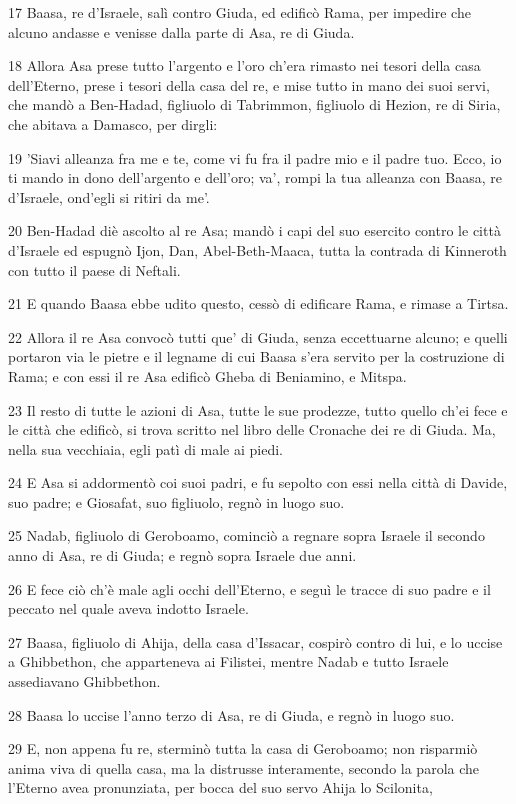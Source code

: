 \par 17 Baasa, re d'Israele, salì contro Giuda, ed edificò Rama, per impedire che alcuno andasse e venisse dalla parte di Asa, re di Giuda.
\par 18 Allora Asa prese tutto l'argento e l'oro ch'era rimasto nei tesori della casa dell'Eterno, prese i tesori della casa del re, e mise tutto in mano dei suoi servi, che mandò a Ben-Hadad, figliuolo di Tabrimmon, figliuolo di Hezion, re di Siria, che abitava a Damasco, per dirgli:
\par 19 'Siavi alleanza fra me e te, come vi fu fra il padre mio e il padre tuo. Ecco, io ti mando in dono dell'argento e dell'oro; va', rompi la tua alleanza con Baasa, re d'Israele, ond'egli si ritiri da me'.
\par 20 Ben-Hadad diè ascolto al re Asa; mandò i capi del suo esercito contro le città d'Israele ed espugnò Ijon, Dan, Abel-Beth-Maaca, tutta la contrada di Kinneroth con tutto il paese di Neftali.
\par 21 E quando Baasa ebbe udito questo, cessò di edificare Rama, e rimase a Tirtsa.
\par 22 Allora il re Asa convocò tutti que' di Giuda, senza eccettuarne alcuno; e quelli portaron via le pietre e il legname di cui Baasa s'era servito per la costruzione di Rama; e con essi il re Asa edificò Gheba di Beniamino, e Mitspa.
\par 23 Il resto di tutte le azioni di Asa, tutte le sue prodezze, tutto quello ch'ei fece e le città che edificò, si trova scritto nel libro delle Cronache dei re di Giuda. Ma, nella sua vecchiaia, egli patì di male ai piedi.
\par 24 E Asa si addormentò coi suoi padri, e fu sepolto con essi nella città di Davide, suo padre; e Giosafat, suo figliuolo, regnò in luogo suo.
\par 25 Nadab, figliuolo di Geroboamo, cominciò a regnare sopra Israele il secondo anno di Asa, re di Giuda; e regnò sopra Israele due anni.
\par 26 E fece ciò ch'è male agli occhi dell'Eterno, e seguì le tracce di suo padre e il peccato nel quale aveva indotto Israele.
\par 27 Baasa, figliuolo di Ahija, della casa d'Issacar, cospirò contro di lui, e lo uccise a Ghibbethon, che apparteneva ai Filistei, mentre Nadab e tutto Israele assediavano Ghibbethon.
\par 28 Baasa lo uccise l'anno terzo di Asa, re di Giuda, e regnò in luogo suo.
\par 29 E, non appena fu re, sterminò tutta la casa di Geroboamo; non risparmiò anima viva di quella casa, ma la distrusse interamente, secondo la parola che l'Eterno avea pronunziata, per bocca del suo servo Ahija lo Scilonita,
